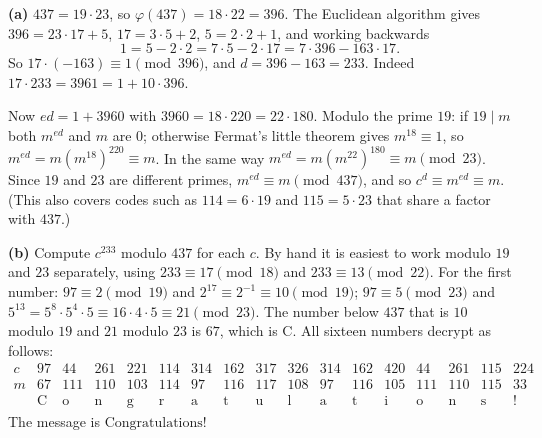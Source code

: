 \textbf{(a)} $437=19\cdot23$, so $\varphi(437)=18\cdot22=396$. The Euclidean algorithm gives $396=23\cdot17+5$, $17=3\cdot5+2$, $5=2\cdot2+1$, and working backwards
\[1=5-2\cdot2=7\cdot5-2\cdot17=7\cdot396-163\cdot17 .\]
So $17\cdot(-163)\equiv1\pmod{396}$, and $d=396-163=\boxed{233}$. Indeed $17\cdot233=3961=1+10\cdot396$.

Now $ed=1+3960$ with $3960=18\cdot220=22\cdot180$. Modulo the prime $19$: if $19\mid m$ both $m^{ed}$ and $m$ are $0$; otherwise Fermat's little theorem gives $m^{18}\equiv1$, so $m^{ed}=m\left(m^{18}\right)^{220}\equiv m$. In the same way $m^{ed}=m\left(m^{22}\right)^{180}\equiv m\pmod{23}$. Since $19$ and $23$ are different primes, $m^{ed}\equiv m\pmod{437}$, and so $c^d\equiv m^{ed}\equiv m$. (This also covers codes such as $114=6\cdot19$ and $115=5\cdot23$ that share a factor with $437$.)

\textbf{(b)} Compute $c^{233}$ modulo $437$ for each $c$. By hand it is easiest to work modulo $19$ and $23$ separately, using $233\equiv17\pmod{18}$ and $233\equiv13\pmod{22}$. For the first number: $97\equiv2\pmod{19}$ and $2^{17}\equiv2^{-1}\equiv10\pmod{19}$; $97\equiv5\pmod{23}$ and $5^{13}=5^8\cdot5^4\cdot5\equiv16\cdot4\cdot5\equiv21\pmod{23}$. The number below $437$ that is $10$ modulo $19$ and $21$ modulo $23$ is $67$, which is C. All sixteen numbers decrypt as follows:
\[\begin{array}{c|cccccccccccccccc}
c&97&44&261&221&114&314&162&317&326&314&162&420&44&261&115&224\\\hline
m&67&111&110&103&114&97&116&117&108&97&116&105&111&110&115&33\\
&\text{C}&\text{o}&\text{n}&\text{g}&\text{r}&\text{a}&\text{t}&\text{u}&\text{l}&\text{a}&\text{t}&\text{i}&\text{o}&\text{n}&\text{s}&\text{!}
\end{array}\]
The message is $\boxed{\text{Congratulations!}}$
